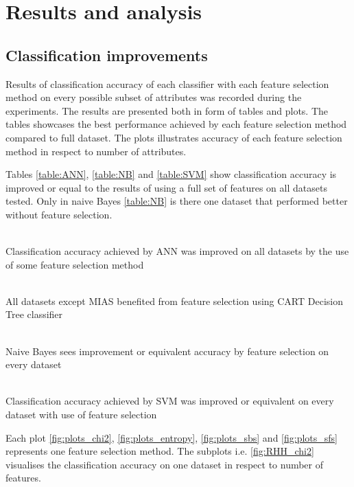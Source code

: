 \chapter{Results and analysis}

\section{Classification improvements}

Results of classification accuracy of each classifier with each feature selection method on every possible subset of attributes was recorded during the experiments. The results are presented both in form of tables and plots. The tables showcases the best performance achieved by each feature selection method compared to full dataset. The plots illustrates accuracy of each feature selection method in respect to number of attributes.

Tables \ref{table:ANN}, \ref{table:NB} and \ref{table:SVM} show classification accuracy is improved or equal to the results of using a full set of features on all datasets tested. Only in naive Bayes \ref{table:NB} is there one dataset that performed better without feature selection.

\begin{table}
   \\
  \caption{Classification accuracy achieved by ANN was improved on all datasets by the use of some feature selection method}
  \label{table:ANN}
  \vspace{1em}

   \\
  \caption{All datasets except MIAS benefited from feature selection using CART Decision Tree classifier}
  \label{table:CART}
  \vspace{1em}

   \\
  \caption{Naive Bayes sees improvement or equivalent accuracy by feature selection on every dataset}
  \label{table:NB}
  \vspace{1em}

   \\
  \caption{Classification accuracy achieved by SVM was improved or equivalent on every dataset with use of feature selection}
  \label{table:SVM}
\end{table}

Each plot \ref{fig:plots_chi2}, \ref{fig:plots_entropy}, \ref{fig:plots_sbs} and \ref{fig:plots_sfs} represents one feature selection method. The subplots i.e. \ref{fig:RHH_chi2} visualises the classification accuracy on one dataset in respect to number of features.

